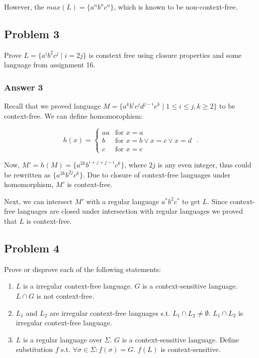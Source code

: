\documentclass[11pt]{article}
\newcommand{\for}{\text{for }}
\begin{document}
However, the $max(L) = \{a^nb^nc^n\}$, which is known to be non-context-free.

\subsection{Problem 3}
\label{sec-1-3}
Prove $L = \{a^ib^2c^j \;|\; i = 2j\}$ is constext free using closure
properties and some language from assignment 16.

\subsubsection{Answer 3}
\label{sec-1-3-1}
Recall that we proved language $M = \{a^kb^ic^jd^{j-i}e^k \;|\; 1 \leq i
    \leq j, k \geq 2\}$ to be context-free.  We can define homomorophism:

\begin{equation*}
  h(x) = \begin{cases}
    aa &\for x=a \\
    b &\for x=b \lor x=c \lor x=d \\
    c &\for x=e
  \end{cases} \;.
\end{equation*}

Now, $M' = h(M) = \{a^{2k}b^{i+j+j-i}c^k\}$, where $2j$ is any even integer,
thus could be rewritten as $\{a^{2k}b^{2j}c^k\}$.  Due to closure of
context-free languages under homomorphism, $M'$ is context-free.

Next, we can intersect $M'$ with a regular language $a^*b^2c^*$ to get $L$.
Since context-free languages are closed under intersection with regular
languages we proved that $L$ is context-free.

\subsection{Problem 4}
\label{sec-1-4}
Prove or disprove each of the following statements:
\begin{enumerate}
\item $L$ is a irregular context-free language.  $G$ is a context-sensitive
language.  $L \cap G$ is not context-free.
\item $L_1$ and $L_2$ are irregular context-free languages s.t. $L_1 \cap L_2
      \neq \emptyset$.  $L_1 \cap L_2$ is irregular context-free language.
\item $L$ is a regular language over $\Sigma$.  $G$ is a context-sensitive
language.  Define substitution $f$ s.t. $\forall \sigma \in \Sigma:
      f(\sigma) = G$.  $f(L)$ is context-sensitive.
\end{enumerate}
\end{document}
